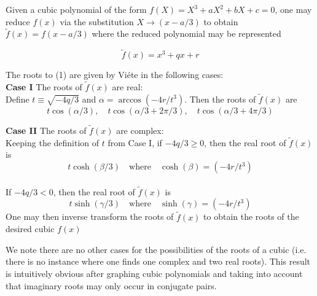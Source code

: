 \documentclass[12pt]{article}
\begin{document}
Given a cubic polynomial of the form $f(X)=X^3+aX^2+bX+c=0$,  one may reduce $f(x)$ via the substitution $X\rightarrow (x-a/3)$ to obtain $\tilde{f}(x)=f(x-a/3)$ where the reduced polynomial may be represented 

\begin{equation}\tilde{f}(x)=x^3+qx+r\end{equation}  

The roots to (1) are given by Vi\'{e}te in the following cases:\\

\textbf{Case I}  The roots of $\tilde{f}(x)$ are real:\\
Define $t\equiv\sqrt{-4q/3}$ and $\alpha=\arccos(-4r/t^3)$.
Then the roots of $\tilde{f}(x)$ are
$$t\cos(\alpha/3),\quad t\cos(\alpha/3+2\pi/3), \quad t\cos(\alpha/3+4\pi/3)$$

\vspace{15pt}

\textbf{Case II} The roots of $\tilde{f}(x)$ are complex:\\
Keeping the definition of $t$ from Case I, if $-4q/3\geq 0$, then the real root of $\tilde{f}(x)$ is
$$t\cosh(\beta/3)\quad \textrm{where}\quad \cosh(\beta)=(-4r/t^3)$$\\   

If $-4q/3< 0$, then the real root of $\tilde{f}(x)$ is
$$t\sinh(\gamma/3)\quad \textrm{where}\quad \sinh(\gamma)=(-4r/t^3)$$
One may then inverse transform the roots of $\tilde{f}(x)$ to obtain the roots of the desired cubic $f(x)$ 

We note there are no other cases for the possibilities of the roots of a cubic (i.e. there is no instance where one finds one complex and two real roots).  This result is intuitively obvious after graphing cubic polynomials and taking into account that imaginary roots may only occur in conjugate pairs.
\end{document}
